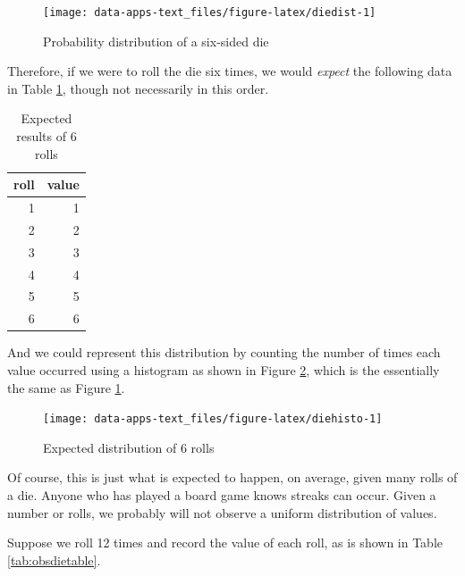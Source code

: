 \documentclass[
]{book}
\begin{document}
\begin{figure}

{\centering \texttt{[image: data-apps-text\_files/figure-latex/diedist-1]} 

}

\caption{Probability distribution of a six-sided die}\label{fig:diedist}
\end{figure}

Therefore, if we were to roll the die six times, we would \emph{expect} the following data in Table \ref{tab:dietable}, though not necessarily in this order.

\begin{table}

\caption{\label{tab:dietable}Expected results of 6 rolls}
\centering
\begin{tabular}[t]{r|r}
\hline
roll & value\\
\hline
1 & 1\\
\hline
2 & 2\\
\hline
3 & 3\\
\hline
4 & 4\\
\hline
5 & 5\\
\hline
6 & 6\\
\hline
\end{tabular}
\end{table}

And we could represent this distribution by counting the number of times each value occurred using a histogram as shown in Figure \ref{fig:diehisto}, which is the essentially the same as Figure \ref{fig:diedist}.

\begin{figure}

{\centering \texttt{[image: data-apps-text\_files/figure-latex/diehisto-1]} 

}

\caption{Expected distribution of 6 rolls}\label{fig:diehisto}
\end{figure}

Of course, this is just what is expected to happen, on average, given many rolls of a die. Anyone who has played a board game knows streaks can occur. Given a number or rolls, we probably will not observe a uniform distribution of values.

Suppose we roll 12 times and record the value of each roll, as is shown in Table \ref{tab:obsdietable}.
\end{document}
